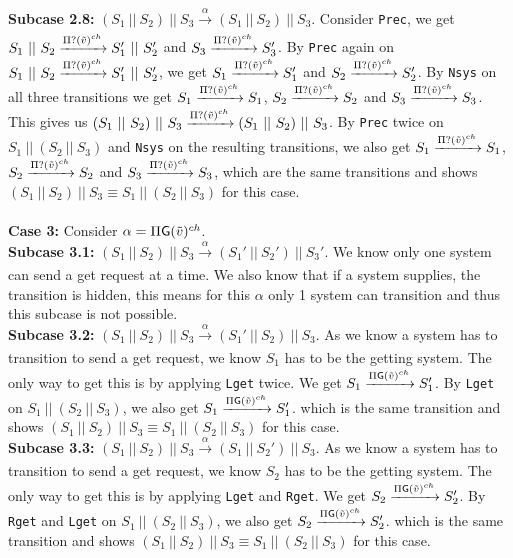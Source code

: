 \indent \textbf{Subcase 2.8: }$(S_1 \ || \ S_2)\ ||\ S_3 \xrightarrow[]{\alpha} (S_1 \ || \ S_2)\ ||\ S_3$. Consider \texttt{Prec}, we get $S_1 \ || \ S_2 \xrightarrow[]{\Pi ? (\Tilde{v})^{ch}} S_1' \ || \ S_2'$ and $S_3 \xrightarrow[]{\Pi ? (\Tilde{v})^{ch}} S_3'$. By \texttt{Prec} again on $S_1 \ || \ S_2 \xrightarrow[]{\Pi ? (\Tilde{v})^{ch}} S_1' \ || \ S_2'$, we get $S_1 \xrightarrow[]{\Pi ? (\Tilde{v})^{ch}} S_1'$ and $S_2 \xrightarrow[]{\Pi ? (\Tilde{v})^{ch}} S_2'$. By \texttt{Nsys} on all three transitions we get $S_1 \xrightarrow[]{\Pi ? (\Tilde{v})^{ch}} S_1$, $S_2 \xrightarrow[]{\Pi ? (\Tilde{v})^{ch}} S_2$ and $S_3 \xrightarrow[]{\Pi ? (\Tilde{v})^{ch}} S_3$. This gives us $(S_1 \ || \ S_2)\ ||\ S_3 \xrightarrow[]{\Pi ? (\Tilde{v})^{ch}} (S_1 \ || \ S_2)\ ||\ S_3$. By \texttt{Prec} twice on $S_1 \ ||\ (S_2 \ || \ S_3)$ and \texttt{Nsys} on the resulting transitions, we also get $S_1 \xrightarrow[]{\Pi ? (\Tilde{v})^{ch}} S_1$, $S_2 \xrightarrow[]{\Pi ? (\Tilde{v})^{ch}} S_2$ and $S_3 \xrightarrow[]{\Pi ? (\Tilde{v})^{ch}} S_3$, which are the same transitions and shows $(S_1 \ ||\ S_2 )\ || \ S_3 \equiv S_1 \ ||\ (S_2 \ || \ S_3)$ for this case.\\
\\
\textbf{Case 3: } Consider $\alpha = \Pi \mathsf{G}(\Tilde{v})^{ch}$.\\
\indent \textbf{Subcase 3.1: }$(S_1 \ || \ S_2)\ ||\ S_3 \xrightarrow[]{\alpha} (S_1' \ || \ S_2')\ ||\ S_3'$. We know only one system can send a get request at a time. We also know that if a system supplies, the transition is hidden, this means for this $\alpha$ only 1 system can transition and thus this subcase is not possible.\\
\indent \textbf{Subcase 3.2: }$(S_1 \ || \ S_2)\ ||\ S_3 \xrightarrow[]{\alpha} (S_1' \ || \ S_2)\ ||\ S_3$. As we know a system has to transition to send a get request, we know $S_1$ has to be the getting system. The only way to get this is by applying \texttt{Lget} twice. We get $S_1\xrightarrow[]{\Pi \mathsf{G}(\Tilde{v})^{ch}} S_1'$. By \texttt{Lget} on $S_1 \ ||\ (S_2 \ || \ S_3)$, we also get $S_1\xrightarrow[]{\Pi \mathsf{G}(\Tilde{v})^{ch}} S_1'$. which is the same transition and shows $(S_1 \ ||\ S_2 )\ || \ S_3 \equiv S_1 \ ||\ (S_2 \ || \ S_3)$ for this case.\\
\indent \textbf{Subcase 3.3: }$(S_1 \ || \ S_2)\ ||\ S_3 \xrightarrow[]{\alpha} (S_1 \ || \ S_2')\ ||\ S_3$. As we know a system has to transition to send a get request, we know $S_2$ has to be the getting system. The only way to get this is by applying \texttt{Lget} and \texttt{Rget}. We get $S_2\xrightarrow[]{\Pi \mathsf{G}(\Tilde{v})^{ch}} S_2'$. By \texttt{Rget} and \texttt{Lget} on $S_1 \ ||\ (S_2 \ || \ S_3)$, we also get $S_2\xrightarrow[]{\Pi \mathsf{G}(\Tilde{v})^{ch}} S_2'$. which is the same transition and shows $(S_1 \ ||\ S_2 )\ || \ S_3 \equiv S_1 \ ||\ (S_2 \ || \ S_3)$ for this case.\\
